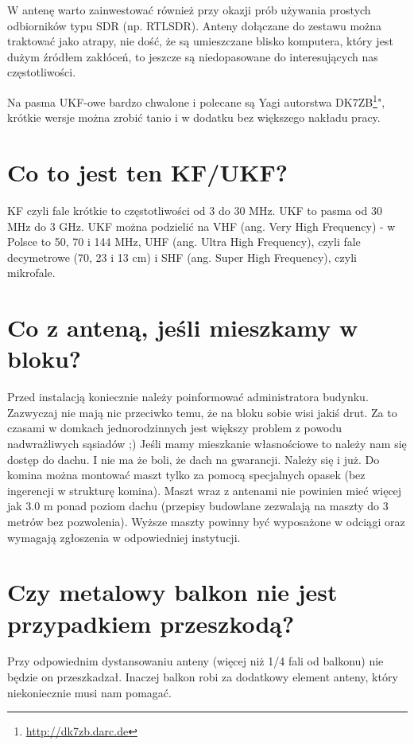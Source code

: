 \documentclass[a4paper,12pt]{article}
\begin{document}
W antenę warto zainwestować również przy okazji prób używania prostych odbiorników typu SDR (np. RTLSDR). Anteny dołączane do zestawu można traktować jako atrapy, nie dość, że są umieszczane blisko komputera, który jest dużym źródłem zakłóceń, to jeszcze są niedopasowane do interesujących nas częstotliwości.

Na pasma UKF-owe bardzo chwalone i polecane są Yagi autorstwa DK7ZB\footnote{\url{http://dk7zb.darc.de}}", krótkie wersje można zrobić tanio i w dodatku bez większego nakładu pracy.

\section{Co to jest ten KF/UKF?}
KF czyli fale krótkie to częstotliwości od 3 do 30 MHz.
UKF to pasma od 30 MHz do 3 GHz. 
UKF można podzielić na VHF (ang. Very High Frequency) - w Polsce to 50, 70 i 144 MHz, UHF (ang. Ultra High Frequency), czyli fale decymetrowe (70, 23 i 13 cm) i SHF (ang. Super High Frequency), czyli mikrofale.

\section{Co z anteną, jeśli mieszkamy w bloku?}
Przed instalacją koniecznie należy poinformować administratora budynku. Zazwyczaj nie mają nic przeciwko temu, że na bloku sobie wisi jakiś drut. Za to czasami w domkach jednorodzinnych jest większy problem z powodu nadwrażliwych sąsiadów ;)
Jeśli mamy mieszkanie własnościowe to należy nam się dostęp do dachu. I nie ma że boli, że dach na gwarancji. Należy się i już.
Do komina można montować maszt tylko za pomocą specjalnych opasek (bez ingerencji w strukturę komina). Maszt wraz z antenami nie powinien mieć więcej jak 3.0 m ponad poziom dachu (przepisy budowlane zezwalają na maszty do 3 metrów bez pozwolenia). Wyższe maszty powinny być wyposażone w odciągi oraz wymagają zgłoszenia w odpowiedniej instytucji.

\section{Czy metalowy balkon nie jest przypadkiem przeszkodą?}
Przy odpowiednim dystansowaniu anteny (więcej niż 1/4 fali od balkonu) nie będzie on przeszkadzał. Inaczej balkon robi za dodatkowy element anteny, który niekoniecznie musi nam pomagać.
\end{document}
